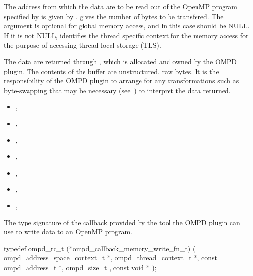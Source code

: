 \argdesc
The address from which the data are to be read out of the OpenMP program
specified by  is given by .
 gives the number of bytes to be transfered.
The  argument is optional for global memory access,
and in this case should be NULL.
If it is not NULL,  identifies the thread
specific context for the memory access for the purpose of accessing
thread local storage (TLS).

The data are returned through , which is allocated and
owned by the OMPD plugin.
The contents of the buffer are unstructured, raw bytes.
It is the responsibility of the OMPD plugin to arrange for
any transformations such as byte-swapping that may be necessary
(see~) to interpret the
data returned.

\crossreferences
\begin{itemize}
\item
  , 
\item
  , 
\item
  , 
\item
  , 
\item
  , 
\item
  , 
\item
  , 
\end{itemize}

\label{ompd:ompd_callback_memory_write_fn_t}

\summary

The type signature of the callback provided by the tool the
OMPD plugin can use to write data to an OpenMP program.


\cspecificstart
\begin{ompSyntax}
typedef ompd_rc_t (*ompd_callback_memory_write_fn_t) (
  ompd_address_space_context_t *,
  ompd_thread_context_t *,
  const ompd_address_t *,
  ompd_size_t                    ,
  const void *
);
\end{ompSyntax}
\cspecificend

